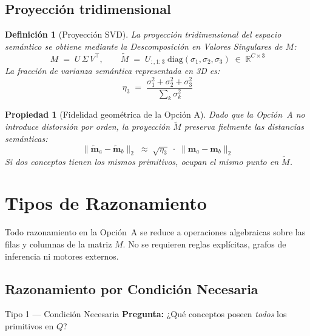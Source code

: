 \documentclass[12pt]{article}
\newtheorem{definition}{Definición}[section]
\newtheorem{property}{Propiedad}[section]
\begin{document}
\subsection{Proyección tridimensional}

\begin{definition}[Proyección SVD]
	La proyección tridimensional del espacio semántico se obtiene mediante la
	Descomposición en Valores Singulares de $M$:
	\[
	M \;=\; U\,\Sigma\,V^\top, \qquad
	\tilde{M} \;=\; U_{:,1:3}\;\mathrm{diag}(\sigma_1,\sigma_2,\sigma_3)
	\;\in\; \mathbb{R}^{C \times 3}
	\]
	La fracción de varianza semántica representada en 3D es:
	\[
	\eta_3 \;=\; \frac{\sigma_1^2 + \sigma_2^2 + \sigma_3^2}
	{\displaystyle\sum_{k} \sigma_k^2}
	\]
\end{definition}

\begin{property}[Fidelidad geométrica de la Opción A]
	Dado que la Opción~A no introduce distorsión por orden, la proyección
	$\tilde{M}$ preserva fielmente las distancias semánticas:
	\[
	\bigl\|\tilde{\mathbf{m}}_a - \tilde{\mathbf{m}}_b\bigr\|_2
	\;\approx\; \sqrt{\eta_3}\;\cdot\;
	\bigl\|\mathbf{m}_a - \mathbf{m}_b\bigr\|_2
	\]
	Si dos conceptos tienen los mismos primitivos, ocupan el mismo punto en $\tilde{M}$.
\end{property}

\section{Tipos de Razonamiento}

Todo razonamiento en la Opción~A se reduce a operaciones algebraicas sobre las
filas y columnas de la matriz $M$. No se requieren reglas explícitas, grafos de
inferencia ni motores externos.

\subsection{Razonamiento por Condición Necesaria}

\begin{razonbox}{Tipo 1 — Condición Necesaria}
	\textbf{Pregunta:} ¿Qué conceptos poseen \emph{todos} los primitivos en $Q$?
\end{razonbox}
\end{document}
